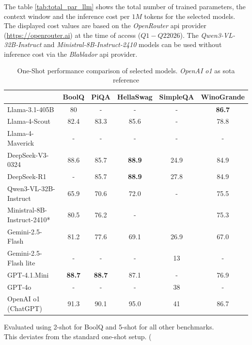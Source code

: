 %
The table \cref{tab:total_par_llm} shows the total number of trained parameters, the context window and the inference cost per $1M$ tokens for the selected models.
The displayed cost values are based on the \textit{OpenRouter} \ac{api} provider (\url{https://openrouter.ai}) at the time of access ($Q1-Q2 2026$).
The \textit{Qwen3-VL-32B-Instruct} and \textit{Ministral-8B-Instruct-2410} models can be used without inference cost via the \textit{Blablador} \ac{api} provider.
%
\begin{table}[H]
    \centering
    \begin{threeparttable}
    \setlength{\tabcolsep}{4pt}
    \small
    \begin{tabular}{lccccc}
        \toprule
                            &  BoolQ            & PiQA          & HellaSwag         & SimpleQA           & WinoGrande   \\
        \midrule
        Llama-3.1-405B       & 80     & - & -     & - & \textbf{86.7}  \\
        Llama-4-Scout       & 82.4     & 83.3 & 85.6     & - & 78.8  \\
        Llama-4-Maverick       & -     & - & -     & - & -  \\
        DeepSeek-V3\footnotesize{-0324}         & 88.6       & 85.7   & \textbf{88.9}       & 24.9    & 84.9    \\
        DeepSeek-R1              & -          & 85.7   & \textbf{88.9}       & 27.8    & 84.9    \\
        Qwen3-\scriptsize{VL-32B-Instruct}           & 65.9       & 70.6   & 72.0       & - & 75.5  \\
        Ministral-8B\scriptsize{-Instruct-2410*}           & 80.5       & 76.2   & -       &  & 75.3  \\
        Gemini-2.5-Flash    & 81.2       & 77.6    & 69.1         & 26.9   & 67.0  \\
        Gemini-2.5-Flash \scriptsize{lite}    & -       & -    & -         & 13   & -  \\
        GPT-4.1.Mini        & \textbf{88.7}     & \textbf{88.7}    & 87.1         & -   & 76.9  \\
        GPT-4o         & -     & -    & -         & 38   & -  \\
        OpenAI o1 \scriptsize{(ChatGPT)}             & 91.3      & 90.1    & 95.0         & 41   & 86.7  \\
        \bottomrule
    \end{tabular}
    \caption[One-Shot Performance Comparison]{
        One-Shot performance comparison of selected models. \textit{OpenAI o1} as \ac{sota} reference}\label{tab:one_shot_llm}
        \begin{tablenotes}\footnotesize
            \item[*] Evaluated using 2-shot for BoolQ and 5-shot for all other benchmarks.\\
            This deviates from the standard one-shot setup. (\citet{NVIDIA2026PhiMinistralModels}
        \end{tablenotes}
        \end{threeparttable}
\end{table}
